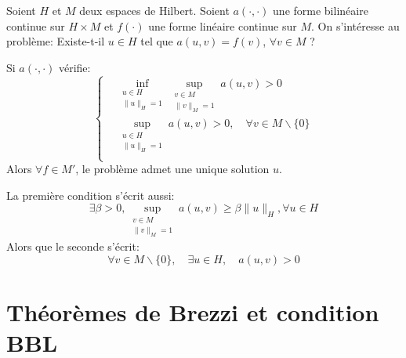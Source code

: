 \medskip
\begin{theoreme}

Soient $H$ et $M$ deux espaces de Hilbert.
Soient $a(\cdot,\cdot)$  une forme bilinéaire continue sur $H \times M$
et $f(\cdot)$ une forme linéaire continue sur $M$.
On s'intéresse au problème: Existe-t-il $u\in H$ tel que $a(u,v)=f(v)$, $\forall v\in M$ ?

Si $a(\cdot,\cdot)$ vérifie:
\begin{equation}\left\{
\begin{aligned}
&\displaystyle\inf_{\substack{u\in H\\\|u\|_H=1}} \sup_{\substack{v\in M\\\|v\|_M=1}} a(u,v) > 0\\[+2mm]
&\displaystyle\sup_{\substack{u\in H\\\|u\|_H=1}} a(u,v) > 0, \quad\forall v\in M\backslash\{0\}\\
\end{aligned}\right.
\end{equation}
Alors $\forall f\in M'$, le problème admet une unique solution $u$.
\end{theoreme}

\medskip
La première condition s'écrit aussi:
\begin{equation}
\exists \beta > 0, \sup_{\substack{v\in M\\\|v\|_M=1}} a(u,v) \ge \beta \|u\|_H, \forall u\in H
\end{equation}
Alors que le seconde s'écrit:
\begin{equation}
\forall v\in M\backslash\{0\},\quad \exists u\in H,\quad a(u,v)>0
\end{equation}


\medskip
{}


\section{Théorèmes de Brezzi et condition BBL}\label{Sec-ThBrezzi}

